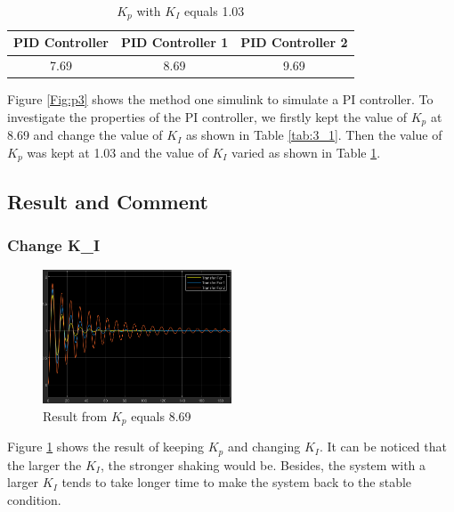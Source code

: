 \documentclass[11pt, a4paper]{article}
\begin{document}
\begin{table}[htbp]
\caption{$K_{p}$ with $K_{I}$ equals 1.03}
\label{tab:3_2}
\begin{center}
\begin{tabular}{ccc}
\hline
 PID Controller      & PID Controller 1       & PID Controller 2   \\
\hline
7.69         & 8.69         &  9.69         \\

\hline
\end{tabular}
\end{center}
\end{table}

Figure \ref{Fig:p3} shows the method one simulink to simulate a PI controller. To investigate the properties of the PI controller, we firstly kept the value of $K_{p}$ at 8.69 and change the value of $K_{I}$ as shown in Table \ref{tab:3_1}. Then the value of $K_{p}$ was kept at 1.03 and the value of $K_{I}$ varied as shown in Table \ref{tab:3_2}.

\subsection{Result and Comment}

\subsubsection{Change K_{I}}

\begin{figure}[htbp]     \begin{centering}
    \includegraphics[width=0.5\textwidth]{3_1.png}
    \caption{ \label{Fig:p3_1}Result from $K_{p}$ equals 8.69}
    \end{centering}
   
\end{figure}

Figure \ref{Fig:p3_1} shows the result of keeping $K_{p}$ and changing $K_{I}$. It can be noticed that the larger the $K_{I}$, the stronger shaking would be. Besides, the system with a larger $K_{I}$ tends to take longer time to make the system back to the stable condition.
\end{document}
